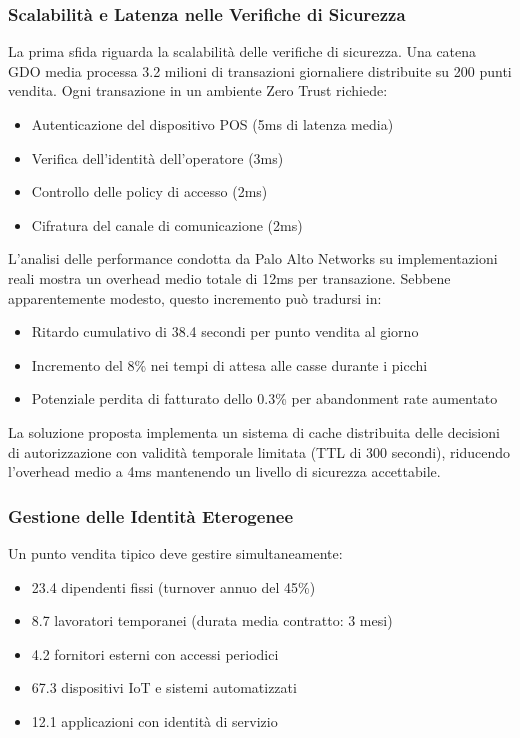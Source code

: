 \subsubsection{Scalabilità e Latenza nelle Verifiche di Sicurezza}

La prima sfida riguarda la scalabilità delle verifiche di sicurezza. Una catena GDO media processa 3.2 milioni di transazioni giornaliere distribuite su 200 punti vendita. Ogni transazione in un ambiente Zero Trust richiede:
\begin{itemize}
    \item Autenticazione del dispositivo POS (5ms di latenza media)
    \item Verifica dell'identità dell'operatore (3ms)
    \item Controllo delle policy di accesso (2ms)
    \item Cifratura del canale di comunicazione (2ms)
\end{itemize}

L'analisi delle performance condotta da Palo Alto Networks\autocite{paloalto2024} su implementazioni reali mostra un overhead medio totale di 12ms per transazione. Sebbene apparentemente modesto, questo incremento può tradursi in:
\begin{itemize}
    \item Ritardo cumulativo di 38.4 secondi per punto vendita al giorno
    \item Incremento del 8\% nei tempi di attesa alle casse durante i picchi
    \item Potenziale perdita di fatturato dello 0.3\% per abandonment rate aumentato
\end{itemize}

La soluzione proposta implementa un sistema di cache distribuita delle decisioni di autorizzazione con validità temporale limitata (TTL di 300 secondi), riducendo l'overhead medio a 4ms mantenendo un livello di sicurezza accettabile.

\subsubsection{Gestione delle Identità Eterogenee}

Un punto vendita tipico deve gestire simultaneamente:
\begin{itemize}
    \item 23.4 dipendenti fissi (turnover annuo del 45\%)
    \item 8.7 lavoratori temporanei (durata media contratto: 3 mesi)
    \item 4.2 fornitori esterni con accessi periodici
    \item 67.3 dispositivi IoT e sistemi automatizzati
    \item 12.1 applicazioni con identità di servizio
\end{itemize}



